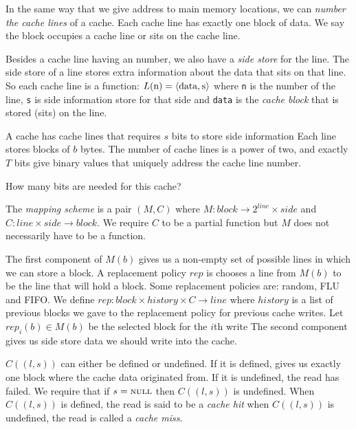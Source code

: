 In the same way that we give address to main memory locations, 
we can \textit{number the cache lines} of a cache. 
Each cache line has exactly one block of data.
We say the block occupies a cache line or sits on the cache line. 

Besides a cache line having an number, we also have a \textit{side store} for the 
line. The side store of a line stores extra information about the data that sits 
on that line. So each cache line is a function: 
$L(\text{\lstinline{n}}) =
\langle \text{\lstinline{data}}, \text{\lstinline{s}} \rangle$
where \lstinline{n} is the number of the line,
\lstinline{s} is side information store for that side and
\lstinline{data} is the \textit{cache block} that is stored (sits) on the line.

\frmrule

\begin{example}
A cache has cache lines that requires $s$ bits to store side information 
Each line stores blocks of $b$ bytes.
The number of cache lines is a power of two, and exactly $T$ bits 
give binary values that uniquely address the cache line number. 

How many bits are needed for this cache?
\end{example}




\frmrule

The \textit{mapping scheme} is a pair  
$(M,C)$ where $M : block \rightarrow 2^{line} \times side$ and 
$C : line \times side \rightarrow block$.
We require $C$ to be a partial function but $M$ does not 
necessarily have to be a function.

The first component of $M(b)$ gives us a non-empty set of 
possible lines in which 
we can store a block. A replacement policy $rep$ is chooses 
a line from $M(b)$ to be the line that will hold a block.
Some replacement policies are: random, FLU and FIFO. 
We define
$rep : block \times history \times C \rightarrow line$
where $history$ is a list of previous blocks 
we gave to the replacement policy for previous cache writes. 
Let $rep_i(b) \in M(b)$ be the selected block for the $i$th write
The second component gives us side store data we should 
write into the cache.

$C((l,s))$ can either be defined or undefined.
If it is defined, gives us exactly one block where the cache 
data originated from. If it is undefined, the read 
has failed. 
We require that if $s = \textsc{null}$ then 
$C((l,s))$ is undefined.
When $C((l,s))$ is defined, the read is said to be a \textit{cache hit}
when $C((l,s))$ is undefined, the read is called a 
\textit{cache miss}.

